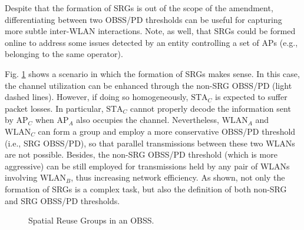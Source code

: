 \documentclass[comsoc]{IEEEtran}
\begin{document}
	Despite that the formation of SRGs is out of the scope of the amendment, differentiating between two OBSS/PD thresholds can be useful for capturing more subtle inter-WLAN interactions. Note, as well, that SRGs could be formed online to address some issues detected by an entity controlling a set of APs (e.g., belonging to the same operator).
	
	Fig. \ref{fig:fig_4} shows a scenario in which the formation of SRGs makes sense. In this case, the channel utilization can be enhanced through the non-SRG OBSS/PD (light dashed lines). However, if doing so homogeneously, $\text{STA}_C$ is expected to suffer packet losses. In particular, $\text{STA}_C$ cannot properly decode the information sent by $\text{AP}_C$ when $\text{AP}_A$ also occupies the channel. Nevertheless, $\text{WLAN}_A$ and $\text{WLAN}_C$ can form a group and employ a more conservative OBSS/PD threshold (i.e., SRG OBSS/PD), so that parallel transmissions between these two WLANs are not possible. Besides, the non-SRG OBSS/PD threshold (which is more aggressive) can be still employed for transmissions held by any pair of WLANs involving $\text{WLAN}_B$, thus increasing network efficiency. As shown, not only the formation of SRGs is a complex task, but also the definition of both non-SRG and SRG OBSS/PD thresholds.
	
	\begin{figure}[ht!]
		\centering
		\caption{Spatial Reuse Groups in an OBSS.}
		\label{fig:fig_4}
	\end{figure}
	
\end{document}
